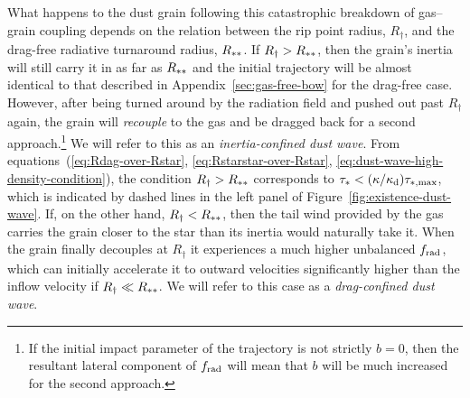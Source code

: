 What happens to the dust grain following this catastrophic breakdown
of gas--grain coupling depends on the relation between the rip point
radius, \(R_\dag\), and the drag-free radiative turnaround radius,
\(R_{**}\).  If \(R_\dag > R_{**}\), then the grain's inertia
will still carry it in as far as \(R_{**}\) and the initial
trajectory will be almost identical to that described in
Appendix~\ref{sec:gas-free-bow} for the drag-free case. However, after
being turned around by the radiation field and pushed out past
\(R_\dag\) again, the grain will \emph{recouple} to the gas and be
dragged back for a second approach.\footnote{If the initial impact
  parameter of the trajectory is not strictly \(b = 0\), then the
  resultant lateral component of \(f_{\text{rad}}\) will mean that \(b\) will
  be much increased for the second approach.} %
We will refer to this as an \textit{inertia-confined dust wave}.  From
equations~(\ref{eq:Rdag-over-Rstar}, \ref{eq:Rstarstar-over-Rstar},
\ref{eq:dust-wave-high-density-condition}), the condition
\(R_\dag > R_{**}\) corresponds to
\(\tau_* < (\kappa/\kappa_{\text{d}}) \tau_{*,\text{max}}\), which is indicated by dashed
lines in the left panel of Figure~\ref{fig:existence-dust-wave}.  If,
on the other hand, \(R_\dag < R_{**}\), then the tail wind provided
by the gas carries the grain closer to the star than its inertia would
naturally take it.  When the grain finally decouples at \(R_\dag\) it
experiences a much higher unbalanced \(f_{\text{rad}}\), which can initially
accelerate it to outward velocities significantly higher than the
inflow velocity if \(R_\dag \ll R_{**}\).  We will refer to this case
as a \textit{drag-confined dust wave}.


